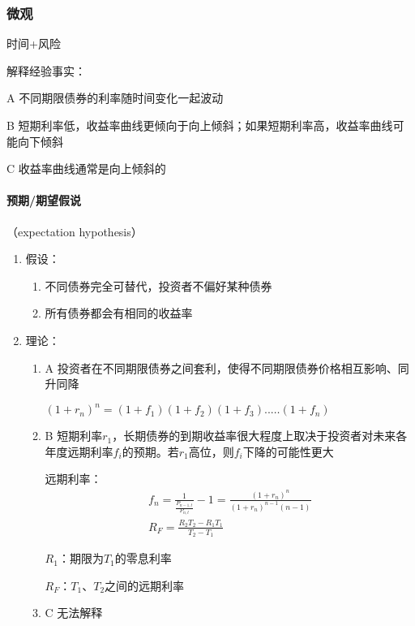 \documentclass[12pt]{book}
\begin{document}
\subsubsection{微观}


\par * 时间+风险
\par * 解释经验事实：
\par A 不同期限债券的利率随时间变化一起波动
\par B 短期利率低，收益率曲线更倾向于向上倾斜；如果短期利率高，收益率曲线可能向下倾斜
\par C 收益率曲线通常是向上倾斜的

\paragraph{预期/期望假说}

（expectation hypothesis）

\begin{enumerate}[1.]
    \item 假设：
          \begin{enumerate}[(1)]
              \item 不同债券完全可替代，投资者不偏好某种债券
              \item 所有债券都会有相同的收益率
          \end{enumerate}
    \item 理论：
          \begin{enumerate}[(1)]
              \item A 投资者在不同期限债券之间套利，使得不同期限债券价格相互影响、同升同降
                    \par $\left(1+r_n\right)^n=\left(1+f_1\right)\left(1+f_2\right)\left(1+f_3\right)..\ldots\left(1+f_n\right)$
              \item B 短期利率$r_1$，长期债券的到期收益率很大程度上取决于投资者对未来各年度远期利率$f_i$的预期。若$r_1$高位，则$f_i$下降的可能性更大
                    \par 远期利率：
                    \begin{gather*}
                        f_n = \frac{1}{\frac{P_{n-1,t}}{P_{n,t}}}-1=\frac{\left(1+r_n\right)^n}{\left(1+r_n\right)^{n-1}(n-1)}\\
                        R_F = \frac{R_2T_2-R_1T_1}{T_2-T_1}
                    \end{gather*}
                    \par $R_1$：期限为$T_1$的零息利率
                    \par $R_F$：$T_1$、$T_2$之间的远期利率
              \item C 无法解释
          \end{enumerate}
\end{enumerate}
\end{document}
